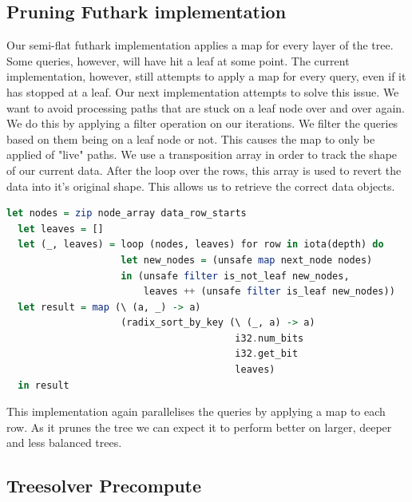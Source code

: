 \documentclass[a4paper]{article}
\begin{document}
\colorbox{lightgray}{\usebox\lstboxtwo}

\subsection{Pruning Futhark implementation}

Our semi-flat futhark implementation applies a map for every layer of the tree. Some queries, however, will have hit a leaf at some point. The current implementation, however, still attempts to apply a map for every query, even if it has stopped at a leaf. Our next implementation attempts to solve this issue.
We want to avoid processing paths that are stuck on a leaf node over and over again. We do this by applying a filter operation on our iterations. We filter the queries based on them being on a leaf node or not. This causes the map to only be applied of "live" paths.
We use a transposition array in order to track the shape of our current data. After the loop over the rows, this array is used to revert the data into it's original shape. This allows us to retrieve the correct data objects.

\vspace{1ex}
\begin{lrbox}{\lstboxthree}
\begin{minipage}{\textwidth}
\begin{lstlisting}[language=Haskell, breaklines]
  let nodes = zip node_array data_row_starts
  let leaves = []
  let (_, leaves) = loop (nodes, leaves) for row in iota(depth) do
                    let new_nodes = (unsafe map next_node nodes)
                    in (unsafe filter is_not_leaf new_nodes,
                        leaves ++ (unsafe filter is_leaf new_nodes))
  let result = map (\ (a, _) -> a)
                    (radix_sort_by_key (\ (_, a) -> a) 
                                        i32.num_bits
                                        i32.get_bit
                                        leaves)
  in result
\end{lstlisting}
\end{minipage}
\end{lrbox}
\vspace{1ex}

\colorbox{lightgray}{\usebox\lstboxthree}

This implementation again parallelises the queries by applying a map to each row. As it prunes the tree we can expect it to perform better on larger, deeper and less balanced trees. 

\subsection{Treesolver Precompute}
\end{document}
